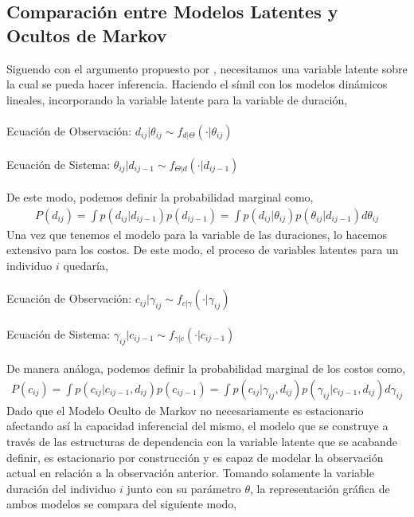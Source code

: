 \subsection{Comparaci\'on entre Modelos Latentes y Ocultos de Markov}
Siguendo con el argumento propuesto por \cite{pitt2002constructing}, necesitamos una variable latente sobre la cual se pueda hacer inferencia. Haciendo el s\'imil con los modelos din\'amicos lineales, incorporando la variable latente para la variable de duraci\'on,\\
\\
Ecuaci\'on de Observaci\'on: $d_{ij}|\theta_{ij} \sim f_{d|\Theta}(\cdot|\theta_{ij})$\\
\\
Ecuaci\'on de Sistema: $\theta_{ij}|d_{ij-1} \sim f_{\Theta|d}(\cdot|d_{ij-1})$\\
\\
De este modo, podemos definir la probabilidad marginal como,
\begin{align*}
P(d_{ij})=\int p(d_{ij}|d_{ij-1})p(d_{ij-1})=\int p(d_{ij}|\theta_{ij})p(\theta_{ij}|d_{ij-1})d\theta_{ij}
\end{align*}
Una vez que tenemos el modelo para la variable de las duraciones, lo hacemos extensivo para los costos. De este modo, el proceso de variables latentes para un individuo $i$ quedar\'ia,\\
\\
Ecuaci\'on de Observaci\'on: $c_{ij}|\gamma_{ij} \sim f_{c|\gamma}(\cdot|\gamma_{ij})$\\
\\
Ecuaci\'on de Sistema: $\gamma_{ij}|c_{ij-1} \sim f_{\gamma|c}(\cdot|c_{ij-1})$\\
\\
De manera an\'aloga, podemos definir la probabilidad marginal de los costos como,
\begin{align*}
P(c_{ij})=\int p(c_{ij}|c_{ij-1},d_{ij})p(c_{ij-1})=\int p(c_{ij}|\gamma_{ij},d_{ij})p(\gamma_{ij}|c_{ij-1},d_{ij})d\gamma_{ij}
\end{align*}
Dado que el Modelo Oculto de Markov no necesariamente es estacionario afectando as\'i la capacidad inferencial del mismo, el modelo que se construye a trav\'es de las estructuras de dependencia con la variable latente que se acabande definir, es estacionario por construcci\'on y es capaz de modelar la observaci\'on actual en relaci\'on a la observaci\'on anterior. Tomando solamente la variable duraci\'on del individuo $i$ junto con su par\'ametro $\theta$, la representaci\'on gr\'afica de ambos modelos se compara del siguiente modo,\\
